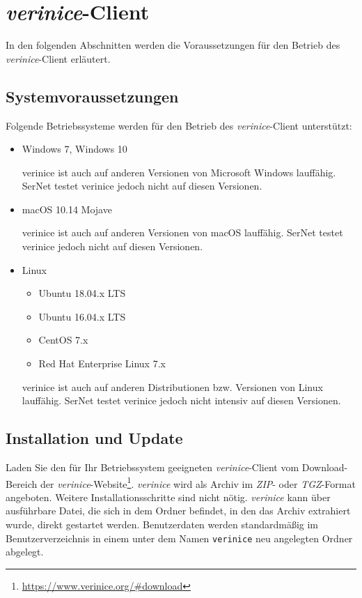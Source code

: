 \documentclass[a4paper,10pt]{book}
\begin{document}
\section{\textit{verinice}-Client}

In den folgenden Abschnitten werden die Voraussetzungen für den Betrieb des
\textit{verinice}-Client erläutert.

\subsection{Systemvoraussetzungen}

Folgende Betriebssysteme werden für den Betrieb des \textit{verinice}-Client
unterstützt:

\begin{itemize}
  \item Windows 7, Windows 10

    verinice ist auch auf anderen Versionen von Microsoft Windows lauffähig.
    SerNet testet verinice jedoch nicht auf diesen Versionen.

  \item macOS 10.14 Mojave

    verinice ist auch auf anderen Versionen von macOS lauffähig. SerNet
    testet verinice jedoch nicht auf diesen Versionen.

  \item Linux
    \begin{itemize}
      \item Ubuntu 18.04.x LTS
      \item Ubuntu 16.04.x LTS
      \item CentOS 7.x
      \item Red Hat Enterprise Linux 7.x
    \end{itemize}

    verinice ist auch auf anderen Distributionen bzw. Versionen von Linux
    lauffähig. SerNet testet verinice jedoch nicht intensiv
    auf diesen Versionen.
\end{itemize}

\subsection{Installation und Update}
\label{sec:installation}

Laden Sie den für Ihr Betriebssystem geeigneten \textit{verinice}-Client vom
Download-Bereich der
\textit{verinice}-Website\footnote{\url{https://www.verinice.org/\#download}}.
\textit{verinice} wird als Archiv im \textit{ZIP}- oder \textit{TGZ}-Format
angeboten. Weitere Installationsschritte sind nicht nötig. \textit{verinice}
kann über ausführbare Datei, die sich in dem Ordner befindet, in den das Archiv
extrahiert wurde, direkt gestartet werden. Benutzerdaten werden standardmäßig im
Benutzerverzeichnis in einem unter dem Namen \texttt{verinice} neu angelegten
Ordner abgelegt.
\end{document}
